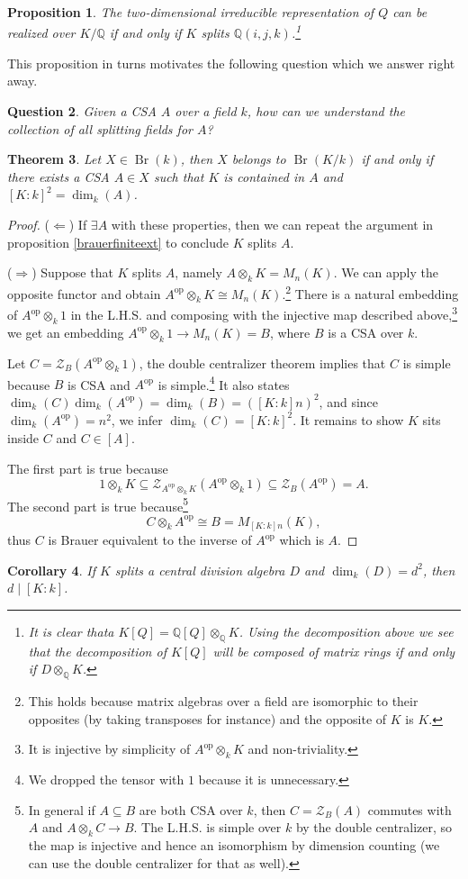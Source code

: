 \documentclass{tufte-handout} %
\newtheorem{thm}{Theorem}
\newtheorem{cor}[thm]{Corollary}
\newtheorem{prop}[thm]{Proposition}
\newtheorem{quest}[thm]{Question}
\theoremstyle{definition}
\theoremstyle{remark}
\newcommand{\op}[1]{#1^{\text{op}}}
\newcommand{\mZ}{\mathcal{Z}}
\newcommand{\Q}{\mathbb{Q}}
\DeclareMathOperator{\Br}{Br}
\begin{document}
\begin{prop}
	The two-dimensional irreducible representation of $Q$ can be realized over $K/\Q$ if and only if $K$ splits $\Q(i,j,k)$.\footnote{It is clear thata $K[Q] = \Q[Q] \otimes_{\Q} K$. Using the decomposition above we see that the decomposition of $K[Q]$ will be composed of matrix rings if and only if $D \otimes_{\Q} K$.}
\end{prop}


This proposition in turns motivates the following question which we answer right away.
\begin{quest}
	Given a CSA $A$ over a field $k$, how can we understand the collection of all splitting fields for $A$?
\end{quest}

\begin{thm}
	Let $X \in \Br(k)$, then $X$ belongs to $\Br(K/k)$ if and only if there exists a CSA $A \in X$ such that $K$ is contained in $A$ and $[K:k]^2 = \dim_k(A)$.
\end{thm}
\begin{proof}
	($\Leftarrow$) If $\exists A$ with these properties, then we can repeat the argument in proposition \ref{brauerfiniteext} to conclude $K$ splits $A$.
	
	($\Rightarrow$) Suppose that $K$ splits $A$, namely $A \otimes_k K = M_n(K)$. We can apply the opposite functor and obtain $\op{A} \otimes_k K \cong M_n(K)$.\footnote{This holds because matrix algebras over a field are isomorphic to their opposites (by taking transposes for instance) and the opposite of $K$ is $K$.} There is a natural embedding of $\op{A} \otimes_k 1$ in the L.H.S. and composing with the injective map described above,\footnote{It is injective by simplicity of $\op{A} \otimes_k K$ and non-triviality.} we get an embedding $\op{A} \otimes_k 1 \rightarrow M_n(K) = B$, where $B$ is a CSA over $k$.
	
	Let $C = \mZ_B(\op{A} \otimes_k 1)$, the double centralizer theorem implies that $C$ is simple because $B$ is CSA and $\op{A}$ is simple.\footnote{We dropped the tensor with $1$ because it is unnecessary.} It also states $\dim_k(C)\dim_k(\op{A}) = \dim_k(B) = ([K:k]n)^2$, and since $\dim_k(\op{A}) = n^2$, we infer $\dim_k(C) = [K:k]^2$. It remains to show $K$ sits inside $C$ and $C \in [A]$.
	
	The first part is true because
	\[1 \otimes_k K \subseteq \mZ_{\op{A}\otimes_k K}(\op{A}\otimes_k 1) \subseteq \mZ_B(\op{A}) = A.\]
	The second part is true because\footnote{In general if $A \subseteq B$ are both CSA over $k$, then $C = \mZ_B(A)$ commutes with $A$ and $A \otimes_k C \rightarrow B$. The L.H.S. is simple over $k$ by the double centralizer, so the map is injective and hence an isomorphism by dimension counting (we can use the double centralizer for that as well).} \[C \otimes_k \op{A} \cong B= M_{[K:k]n}(K),\] thus $C$ is Brauer equivalent to the inverse of $\op{A}$ which is $A$.
\end{proof}
\begin{cor}
	If $K$ splits a central division algebra $D$ and $\dim_k(D) = d^2$, then $d \mid [K:k]$.
\end{cor}
\end{document}
